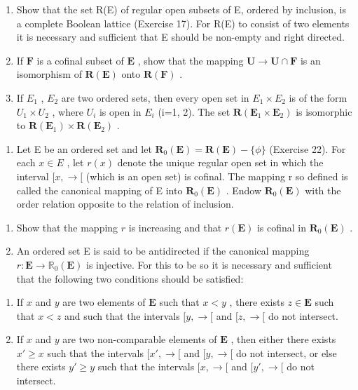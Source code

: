 \begin{enumerate}
\def\labelenumi{(\alph{enumi})}
\setcounter{enumi}{1}
\item
  Show that the set R(E) of regular open subsets of E, ordered by inclusion, is a complete Boolean lattice (Exercise 17). For R(E) to consist of two elements it is necessary and sufficient that E should be non-empty and right directed.
\item
  If \(\mathbf{F}\) is a cofinal subset of \(\mathbf{E}\) , show that the mapping \(\mathbf{U} \to \mathbf{U} \cap \mathbf{F}\) is an isomorphism of \(\mathbf{R}(\mathbf{E})\) onto \(\mathbf{R}(\mathbf{F})\) .
\item
  If \(E_{1}\) , \(E_{2}\) are two ordered sets, then every open set in \(E_{1} \times E_{2}\) is of the form \(U_{1} \times U_{2}\) , where \(U_{i}\) is open in \(E_{i}\) (i=1, 2). The set \(\mathbf{R}(\mathbf{E}_{1} \times \mathbf{E}_{2})\) is isomorphic to \(\mathbf{R}(\mathbf{E}_{1}) \times \mathbf{R}(\mathbf{E}_{2})\) .
\end{enumerate}

\begin{enumerate}
\def\labelenumi{\arabic{enumi}.}
\setcounter{enumi}{22}
\tightlist
\item
  Let E be an ordered set and let \(\mathbf{R}_{0}(\mathbf{E}) = \mathbf{R}(\mathbf{E}) - \{\phi\}\) (Exercise 22). For each \(x \in E\) , let \(r(x)\) denote the unique regular open set in which the interval \([x, \rightarrow[\) (which is an open set) is cofinal. The mapping r so defined is called the canonical mapping of E into \(\mathbf{R}_{0}(\mathbf{E})\) . Endow \(\mathbf{R}_{0}(\mathbf{E})\) with the order relation opposite to the relation of inclusion.
\end{enumerate}

\begin{enumerate}
\def\labelenumi{(\alph{enumi})}
\item
  Show that the mapping \(r\) is increasing and that \(r(\mathbf{E})\) is cofinal in \(\mathbf{R}_0(\mathbf{E})\) .
\item
  An ordered set E is said to be antidirected if the canonical mapping \(r: \mathbf{E} \to \mathbb{R}_{0}(\mathbf{E})\) is injective. For this to be so it is necessary and sufficient that the following two conditions should be satisfied:
\end{enumerate}

\begin{enumerate}
\def\labelenumi{(\Roman{enumi})}
\item
  If \(x\) and \(y\) are two elements of \(\mathbf{E}\) such that \(x < y\) , there exists \(z \in \mathbf{E}\) such that \(x < z\) and such that the intervals \([y, \rightarrow[\) and \([z, \rightarrow[\) do not intersect.
\item
  If \(x\) and \(y\) are two non-comparable elements of \(\mathbf{E}\) , then either there exists \(x' \geqslant x\) such that the intervals \([x', \rightarrow[\) and \([y, \rightarrow[\) do not intersect, or else there exists \(y' \geqslant y\) such that the intervals \([x, \rightarrow[\) and \([y', \rightarrow[\) do not intersect.
\end{enumerate}

